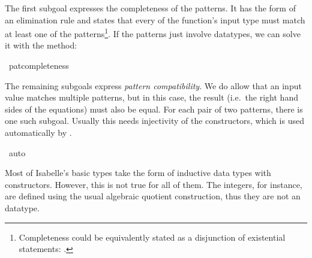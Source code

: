 \begin{isabellebody}
\begin{isamarkuptxt}
  The first subgoal expresses the completeness of the patterns. It has
  the form of an elimination rule and states that every  of
  the function's input type must match at least one of the patterns\footnote{Completeness could
  be equivalently stated as a disjunction of existential statements: 
.}. If the patterns just involve
  datatypes, we can solve it with the 
  method:%
\end{isamarkuptxt}%
\isamarkuptrue%
\isamarkupfalse%
\ pat{\isacharunderscore}completeness%
\begin{isamarkuptxt}%
The remaining subgoals express \emph{pattern compatibility}. We do
  allow that an input value matches multiple patterns, but in this
  case, the result (i.e.~the right hand sides of the equations) must
  also be equal. For each pair of two patterns, there is one such
  subgoal. Usually this needs injectivity of the constructors, which
  is used automatically by .%
\end{isamarkuptxt}%
\isamarkuptrue%
\isamarkupfalse%
\ auto%
\endisatagproof
{\isafoldproof}%
%
\isadelimproof
%
\endisadelimproof
%
\isamarkuptrue%
%
\begin{isamarkuptext}%
Most of Isabelle's basic types take the form of inductive data types
  with constructors. However, this is not true for all of them. The
  integers, for instance, are defined using the usual algebraic
  quotient construction, thus they are not an  datatype.


\end{isamarkuptext}
\end{isabellebody}
